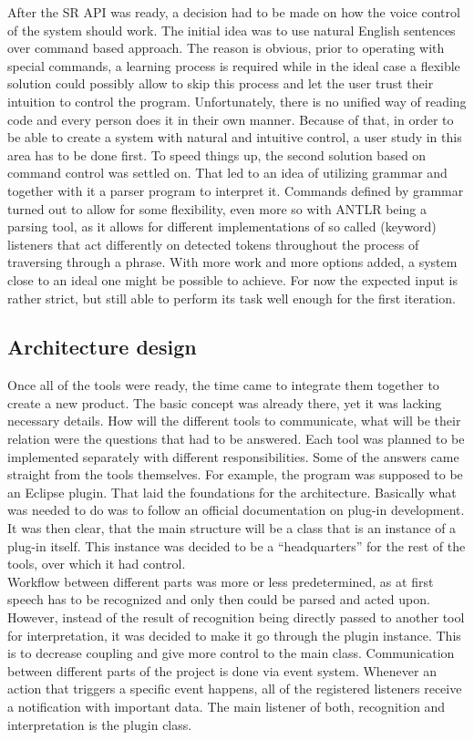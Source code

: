 After the SR API was ready, a decision had to be made on how the voice control of the system should work. The initial idea was to use natural English sentences over command based approach. The reason is obvious, prior to operating with special commands, a learning process is required while in the ideal case a flexible solution could possibly allow to skip this process and let the user trust their intuition to control the program. Unfortunately, there is no unified way of reading code and every person does it in their own manner. Because of that, in order to be able to create a system with natural and intuitive control, a user study in this area has to be done first. To speed things up, the second solution based on command control was settled on. That led to an idea of utilizing grammar and together with it a parser program to interpret it. Commands defined by grammar turned out to allow for some flexibility, even more so with ANTLR being a parsing tool, as it allows for different implementations of so called (keyword) listeners that act differently on detected tokens throughout the process of traversing through a phrase. With more work and more options added, a system close to an ideal one might be possible to achieve. For now the expected input is rather strict, but still able to perform its task well enough for the first iteration.

\subsection{Architecture design}
Once all of the tools were ready, the time came to integrate them together to create a new product. The basic concept was already there, yet it was lacking necessary details. How will the different tools to communicate, what will be their relation \etc were the questions that had to be answered. Each tool was planned to be implemented separately with different responsibilities. Some of the answers came straight from the tools themselves. For example, the program was supposed to be an Eclipse plugin. That laid the foundations for the architecture. Basically what was needed to do was to follow an official documentation on plug-in development. It was then clear, that the main structure will be a class that is an instance of a plug-in itself. This instance was decided to be a ``headquarters'' for the rest of the tools, over which it had control. \\
Workflow between different parts was more or less predetermined, as at first speech has to be recognized and only then could be parsed and acted upon. However, instead of the result of recognition being directly passed to another tool for interpretation, it was decided to make it go through the plugin instance. This is to decrease coupling and give more control to the main class. Communication between different parts of the project is done via event system. Whenever an action that triggers a specific event happens, all of the registered listeners receive a notification with important data. The main listener of both, recognition and interpretation is the plugin class. 

